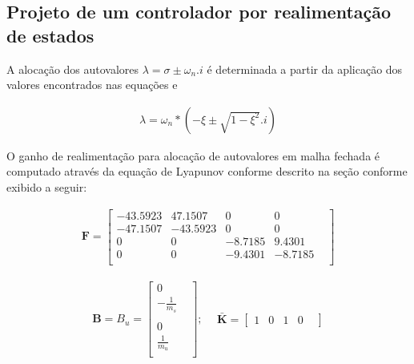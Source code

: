 \subsection{Projeto de um controlador por realimentação de estados} 
A alocação dos autovalores $\lambda = \sigma \pm \omega_n.i$ é determinada a partir da aplicação dos valores encontrados nas equações   e 

\begin{align} \label{eq:autovalores_de_xi}
     \lambda = \omega_n * (-\xi \pm \sqrt{1-\xi^2}.i)
\end{align}
    
O ganho de realimentação para alocação de autovalores em malha fechada é computado através da equação de Lyapunov conforme descrito na seção   conforme exibido a seguir:
    
    \begin{equation*} 
    \begin{split}
        \mathbf{F} =
        \begin{bmatrix}
            -43.5923 &  47.1507 &       0       & 0 & \\ 
            -47.1507 & -43.5923 &       0 &       0 & \\
                   0 &        0 & -8.7185 &  9.4301 & \\
                   0 &        0 & -9.4301 & -8.7185 & \\
        \end{bmatrix}
    \end{split}
    \end{equation*} 
 
    \begin{equation*} 
    \begin{split}
        \mathbf{B} = B_u = 
        \begin{bmatrix}
            0 & \\
            -\frac{1}{m_s}&\\ \\
            0 & \\
            \frac{1}{m_u} \\
        \end{bmatrix};\ \
    \end{split}
    \begin{split}
    \mathbf{\bar{K}} =
        \begin{bmatrix}
        1&0&1&0&
        \end{bmatrix}
    \end{split}
    \end{equation*} 
    
